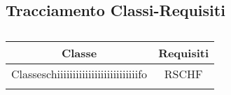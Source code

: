 \documentclass[../PianoDiQualifica.tex]{subfiles}
\begin{document}
	\subsection{Tracciamento Classi-Requisiti}
	\normalsize
	\begin{longtable}{|c|c|}
		\hline 
		\textbf{Classe} & \textbf{Requisiti}\\
		\hline
		\endhead
		Classeschiiiiiiiiiiiiiiiiiiiiiiiiiifo & RSCHF \\ 
		\hline
		
		
		
		
		\caption{}
		\label{}
	\end{longtable}
\end{document}
